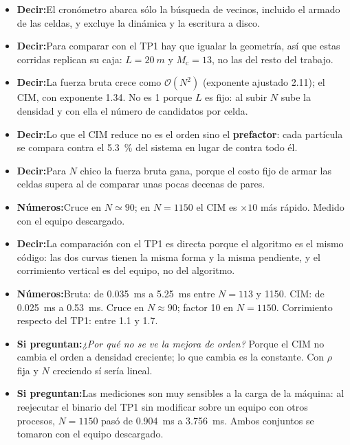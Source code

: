 \documentclass[10pt,a4paper]{article}
\newcommand{\Mc}{\ensuremath{M_{\mathrm{c}}}}
\newcommand{\diapo}[3]{%
    \needspace{5\baselineskip}%
    \vspace{0.7em}%
    \noindent\colorbox{azul}{\makebox[2.1em]{\color{white}\bfseries\small #1}}%
    \colorbox{grisclaro}{\makebox[\dimexpr\linewidth-2.1em-4\fboxsep\relax][l]{%
        \color{azul}\bfseries\small\hspace{0.4em}#2\hfill
        {\color{gris}\mdseries #3}\hspace{0.4em}}}%
    \par\vspace{0.35em}}
\newcommand{\decir}{\textbf{\color{azul}Decir:}\;}
\newcommand{\nums}{\textbf{\color{acento}Números:}\;}
\newcommand{\preg}{\textbf{\color{gris}Si preguntan:}\;}
\newenvironment{notas}
    {\begin{itemize}[leftmargin=1.1em,itemsep=0.15em,topsep=0.15em,parsep=0pt]}
    {\end{itemize}}
\begin{document}
\diapo{29}{Tiempos de ejecución del CIM}{\SI{35}{s}}
\begin{notas}
    \item \decir El cronómetro abarca sólo la búsqueda de vecinos, incluido el
          armado de las celdas, y excluye la dinámica y la escritura a disco.
    \item \decir Para comparar con el TP1 hay que igualar la geometría, así que
          estas corridas replican su caja: $L = \SI{20}{m}$ y $\Mc = 13$, no las
          del resto del trabajo.
    \item \decir La fuerza bruta crece como $\mathcal{O}(N^2)$ (exponente
          ajustado \num{2.11}); el CIM, con
          exponente \num{1.34}. No es \num{1} porque $L$ es fijo: al subir $N$
          sube la densidad y con ella el número de candidatos por celda.
    \item \decir Lo que el CIM reduce no es el orden sino el \textbf{prefactor}:
          cada partícula se compara contra el \SI{5.3}{\percent} del sistema en
          lugar de contra todo él.
    \item \decir Para $N$ chico la fuerza bruta gana, porque el costo fijo de
          armar las celdas supera al de comparar unas pocas decenas de pares.
    \item \nums Cruce en $N \simeq 90$; en $N = 1150$ el CIM es
          $\times\num{10}$ más rápido. Medido con el equipo descargado.
    \item \decir La comparación con el TP1 es directa porque el algoritmo es el
          mismo código: las dos curvas tienen la misma forma y la misma
          pendiente, y el corrimiento vertical es del equipo, no del algoritmo.
    \item \nums Bruta: de \SI{0.035}{\milli\second} a \SI{5.25}{\milli\second}
          entre $N = 113$ y \num{1150}. CIM: de \SI{0.025}{\milli\second} a
          \SI{0.53}{\milli\second}. Cruce en $N \approx 90$; factor \num{10} en
          $N = 1150$. Corrimiento respecto del TP1: entre \num{1.1} y \num{1.7}.
    \item \preg \emph{¿Por qué no se ve la mejora de orden?} Porque el CIM no
          cambia el orden a densidad creciente; lo que cambia es la constante.
          Con $\rho$ fija y $N$ creciendo sí sería lineal.
    \item \preg Las mediciones son muy sensibles a la carga de la máquina: al
          reejecutar el binario del TP1 sin modificar sobre un equipo con otros
          procesos, $N = 1150$ pasó de \SI{0.904}{\milli\second} a
          \SI{3.756}{\milli\second}. Ambos conjuntos se tomaron con el equipo
          descargado.
\end{notas}
\end{document}
